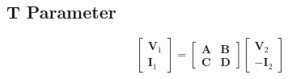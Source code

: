 	\vspace{-4mm}
	\subsection*{$\mathbf{T}$ Parameter} \label{subsec:T Parameter}
		\begin{equation*} \label{eq:T Parameter}
			\begin{bmatrix}
				\mathbf{V}_{1} \\
				\mathbf{I}_{1} 
			\end{bmatrix}
			=\begin{bmatrix}
				\mathbf{A} & \mathbf{B} \\
				\mathbf{C} & \mathbf{D}
			\end{bmatrix}
			\begin{bmatrix}
				\mathbf{V}_{2} \\
				\mathbf{-I}_{2} 
			\end{bmatrix}
	\end{equation*}
	
	
	\vspace{-4mm}
